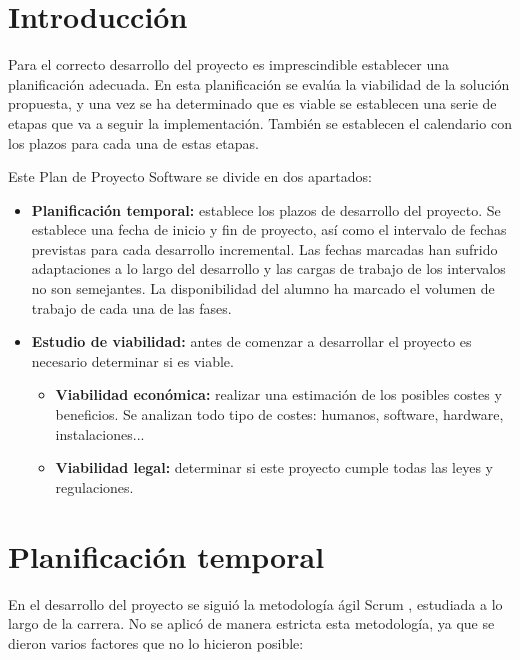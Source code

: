 
\section{Introducción}

Para el correcto desarrollo del proyecto es imprescindible establecer una planificación adecuada. En esta planificación se evalúa la viabilidad de la solución propuesta, y una vez se ha determinado que es viable se establecen una serie de etapas que va a seguir la implementación. También se establecen el calendario con los plazos para cada una de estas etapas.

Este Plan de Proyecto Software se divide en dos apartados:

\begin{itemize}
	\tightlist
	\item
	\textbf{Planificación temporal:} establece los plazos de desarrollo del proyecto. Se establece una fecha de inicio y fin de proyecto, así como el intervalo de fechas previstas para cada desarrollo incremental. Las fechas marcadas han sufrido adaptaciones a lo largo del desarrollo y las cargas de trabajo de los intervalos no son semejantes. La disponibilidad del alumno ha marcado el volumen de trabajo de cada una de las fases.
	\newline
	\item
	\textbf{Estudio de viabilidad:} antes de comenzar a desarrollar el proyecto es necesario determinar si es viable.
	\begin{itemize}
		\tightlist
		\item
		\textbf{Viabilidad económica:} realizar una estimación de los posibles costes y beneficios. Se analizan todo tipo de costes: humanos, software, hardware, instalaciones...
		\item
		\textbf{Viabilidad legal:} determinar si este proyecto cumple todas las leyes y regulaciones.
	\end{itemize}
\end{itemize} 



\newpage
\section{Planificación temporal}

En el desarrollo del proyecto se siguió la metodología ágil Scrum \cite{Scrum}, estudiada a lo largo de la carrera.
No se aplicó de manera estricta esta metodología, ya que se dieron varios factores que no lo hicieron posible:

